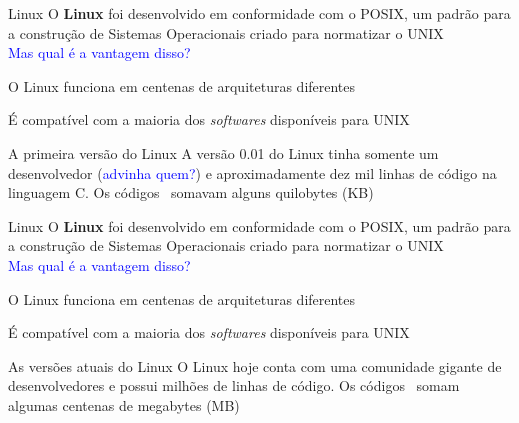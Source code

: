 \documentclass{beamer}
\begin{document}
   \begin{frame}[t]{Linux}
      O \textbf{Linux} foi desenvolvido em conformidade com o POSIX, um padrão para a construção de Sistemas Operacionais criado para normatizar o UNIX \\
      \vspace{\baselineskip}
      \textcolor{blue}{Mas qual é a vantagem disso?}
      \begin{itemize}
	\vspace{\baselineskip}
	{\item O Linux funciona em centenas de arquiteturas diferentes}
	{\item É compatível com a maioria dos \textit{softwares} disponíveis para UNIX}
      \end{itemize}
      {\begin{block}{A primeira versão do Linux}
	\centering
	A versão 0.01 do Linux tinha somente um desenvolvedor (\textcolor{blue}{advinha quem?}) e aproximadamente dez mil linhas de código na linguagem C. Os códigos \ 
        somavam alguns quilobytes (KB) 
      \end{block}}
   \end{frame}

   \begin{frame}[t]{Linux}
      O \textbf{Linux} foi desenvolvido em conformidade com o POSIX, um padrão para a construção de Sistemas Operacionais criado para normatizar o UNIX \\
      \vspace{\baselineskip}
      \textcolor{blue}{Mas qual é a vantagem disso?}
      \begin{itemize}
	\vspace{\baselineskip}
	{\item O Linux funciona em centenas de arquiteturas diferentes}
	{\item É compatível com a maioria dos \textit{softwares} disponíveis para UNIX}
      \end{itemize}
      {\begin{exampleblock}{As versões atuais do Linux}
 	\centering
 	O Linux hoje conta com uma comunidade gigante de desenvolvedores e possui milhões de linhas de código. Os códigos \ 
         somam algumas centenas de megabytes (MB) 
      \end{exampleblock}}
   \end{frame}
\end{document}

